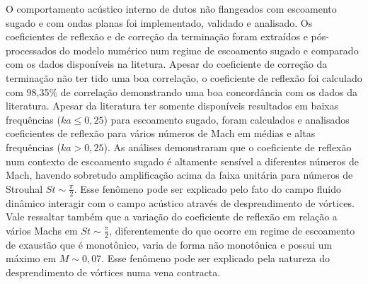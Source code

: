 O comportamento acústico interno de dutos não flangeados com escoamento sugado e com ondas planas foi implementado, validado e analisado. Os coeficientes de reflexão e de correção da terminação foram extraídos e pós-processados do modelo numérico num regime de escoamento sugado e comparado com os dados disponíveis na litetura. Apesar do coeficiente de correção da terminação não ter tido uma boa correlação, o coeficiente de reflexão foi calculado com 98,35\% de correlação demonstrando uma boa concordância com os dados da literatura. Apesar da literatura ter somente disponíveis resultados em baixas frequências ($ka \leq 0,25$) para escoamento sugado, foram calculados e analisados coeficientes de reflexão para vários números de Mach em médias e altas frequências ($ka > 0,25$). As análises demonstraram que o coeficiente de reflexão num contexto de escoamento sugado é altamente sensível a diferentes números de Mach, havendo sobretudo amplificação acima da faixa unitária para números de Strouhal $St \sim \frac{\pi}{2}$. Esse fenômeno pode ser explicado pelo fato do campo fluido dinâmico interagir com o campo acústico através de desprendimento de vórtices. Vale ressaltar também que a variação do coeficiente de reflexão em relação a vários Machs em $St \sim \frac{\pi}{2}$, diferentemente do que ocorre em regime de escoamento de exaustão que é monotônico, varia de forma não monotônica e possui um máximo em $M \sim 0,07$. Esse fenômeno pode ser explicado pela natureza do desprendimento de vórtices numa vena contracta.  